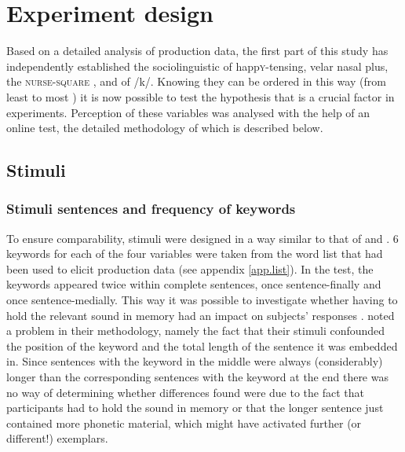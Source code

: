 \chapter{Experiment design}
\label{ch.perc_method}

Based on a detailed analysis of production data, the first part of this study has independently established the sociolinguistic  of happ\textsc{y}-tensing, velar nasal plus, the \textsc{nurse}-\textsc{square} , and  of /k/.
Knowing they can be ordered in this way (from least to most ) it is now possible to test the hypothesis that  is a crucial factor in   experiments.
Perception of these variables was analysed with the help of an online test, the detailed methodology of which is described below.

\section{Stimuli}\label{sec.perc_method.stimuli}
\subsection{Stimuli sentences and frequency of keywords}
\label{sec.perc_method.sentences}

To ensure comparability, stimuli were designed in a way similar to that of \citealt{hayetal2006a} and \citealt{niedzielski1999}.
6 keywords for each of the four variables were taken from the word list that had been used to elicit production data (see appendix \ref{app.list}).
In the test, the keywords appeared twice within complete sentences, once sentence-finally and once sentence-medially.
This way it was possible to investigate whether having to hold the relevant sound in memory had an impact on subjects' responses \citep[cf.][]{hayetal2006a}.
\citet{hayetal2006a} noted a problem in their methodology, namely the fact that their stimuli confounded the position of the keyword and the total length of the sentence it was embedded in.
Since sentences with the keyword in the middle were always (considerably) longer than the corresponding sentences with the keyword at the end there was no way of determining whether differences found were due to the fact that participants had to hold the sound in memory or that the longer sentence just contained more phonetic material, which might have activated further (or different!) exemplars.

